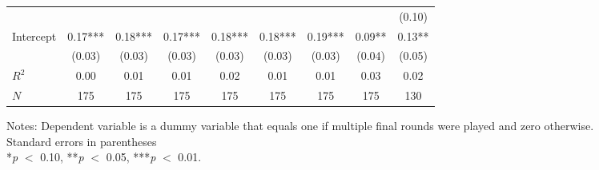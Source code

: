 \begin{table}[htbp]
\begin{threeparttable}
\begin{tabular}{l cccccccc}
                    &               &               &               &               &               &               &               &      (0.10)   \\
Intercept           &        0.17***&        0.18***&        0.17***&        0.18***&        0.18***&        0.19***&        0.09** &        0.13** \\
                    &      (0.03)   &      (0.03)   &      (0.03)   &      (0.03)   &      (0.03)   &      (0.03)   &      (0.04)   &      (0.05)   \\
\hline
$R^2$               &        0.00   &        0.01   &        0.01   &        0.02   &        0.01   &        0.01   &        0.03   &        0.02   \\
$N$                 &         175   &         175   &         175   &         175   &         175   &         175   &         175   &         130   \\
\hline
\hline
\end{tabular}
\begin{tablenotes}
\footnotesize
\item{Notes: Dependent variable is a dummy variable that equals one if multiple final rounds were played and zero otherwise. \\ Standard errors in parentheses \\ *\textit{p} $<$ 0.10, **\textit{p} $<$ 0.05, ***\textit{p} $<$ 0.01.}
\end{tablenotes}
\end{threeparttable}
\end{table}
